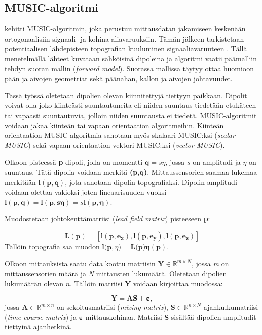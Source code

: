 \subsection{MUSIC-algoritmi}
\cite{Schmidt1986MultipleEstimation} kehitti MUSIC-algoritmin, joka perustuu mittausdatan jakamiseen keskenään ortogonaalisiin signaali- ja kohina-aliavaruuksiin. Tämän jälkeen tarkistetaan potentiaalisen lähdepisteen topografian kuuluminen signaaliavaruuteen \citep{Mosher1999SourceMUSIC}. Tällä menetelmällä lähteet kuvataan sähköisinä dipoleina ja algoritmi vaatii päämalliin tehdyn suoran mallin (\textit{forward model}). Suorassa mallissa täytyy ottaa huomioon pään ja aivojen geometriat sekä päänahan, kallon ja aivojen johtavuudet. \citep{hansen2010meg}

Tässä työssä oletetaan dipolien olevan kiinnitettyjä tiettyyn paikkaan. Dipolit voivat olla joko kiinteästi suuntautuneita eli niiden suuntaus tiedetään etukäteen tai vapaasti suuntautuvia, jolloin niiden suuntausta ei tiedetä. MUSIC-algoritmit voidaan jakaa kiinteän tai vapaan orientaation algoritmeihin. Kiinteän orientaation MUSIC-algoritmia sanotaan myös skalaari-MUSIC:ksi (\textit{scalar MUSIC}) sekä vapaan orientaation vektori-MUSIC:ksi (\textit{vector MUSIC}). \citep{Makela2018TruncatedLocalization}

Olkoon pisteessä \textbf{p} dipoli, jolla on momentti $\mathbf{q} = s\eta$, jossa $s$ on amplitudi ja $\eta$ on suuntaus. Tätä dipolia voidaan merkitä \textbf{(p,q)}. Mittaussensorien saamaa lukemaa merkitään $\mathbf{l(p,q)}$, jota sanotaan dipolin topografiaksi. Dipolin amplitudi voidaan olettaa vakioksi joten lineaarisuuden vuoksi $\mathbf{l(p,q)} = \mathbf{l(p,s\eta)} = s\mathbf{l(p,\eta)}$.

Muodostetaan johtokenttämatriisi (\textit{lead field matrix}) pisteeseen \textbf{p}:

\begin{equation}
    \mathbf{L(p) = [l(p,e_x),l(p,e_y),l(p,e_z)]}
\end{equation}
Tällöin topografia saa muodon $\mathbf{l(p},\eta)=\mathbf{L(p})\mathbf{\eta}(\mathbf{p})$.

Olkoon mittauksista saatu data koottu matriisin $\mathbf{Y}\in \mathbb{R}^{m\times N}$, jossa \textit{m} on mittaussensorien määrä ja \textit{N} mittausten lukumäärä. Oletetaan dipolien lukumäärän olevan $n$. Tällöin matriisi $\mathbf{Y}$ voidaan kirjoittaa muodossa:

\begin{equation}
    \mathbf{Y=AS+\varepsilon},
\end{equation}
jossa $\mathbf{A}\in \mathbb{R}^{m\times n}$ on sekoitusmatriisi (\textit{mixing matrix}), $\mathbf{S}\in \mathbb{R}^{n\times N}$ ajankulkumatriisi (\textit{time-course matrix}) ja $\mathbf{\varepsilon}$ mittauskohinaa. Matriisi \textbf{S} sisältää dipolien amplitudit tiettyinä ajanhetkinä.


